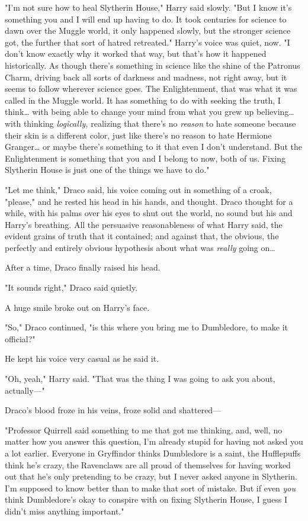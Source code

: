 "I'm not sure how to heal Slytherin House," Harry said slowly. "But I know it's 
something you and I will end up having to do. It took centuries for science to 
dawn over the Muggle world, it only happened slowly, but the stronger science 
got, the further that sort of hatred retreated." Harry's voice was quiet, now. 
"I don't know exactly why it worked that way, but that's how it happened 
historically. As though there's something in science like the shine of the 
Patronus Charm, driving back all sorts of darkness and madness, not right away, 
but it seems to follow wherever science goes. The Enlightenment, that was what 
it was called in the Muggle world. It has something to do with seeking the 
truth, I think{\ldots} with being able to change your mind from what you grew 
up believing{\ldots} with thinking \emph{logically,} realizing that there's no 
\emph{reason} to hate someone because their skin is a different color, just 
like there's no reason to hate Hermione Granger{\ldots} or maybe there's 
something to it that even I don't understand. But the Enlightenment is 
something that you and I belong to now, both of us. Fixing Slytherin House is 
just one of the things we have to do."

"Let me think," Draco said, his voice coming out in something of a croak, 
"please," and he rested his head in his hands, and thought.
\sbreak
Draco thought for a while, with his palms over his eyes to shut out the world, 
no sound but his and Harry's breathing. All the persuasive reasonableness of 
what Harry said, the evident grains of truth that it contained; and against 
that, the obvious, the perfectly and entirely obvious hypothesis about what was 
\emph{really} going on{\ldots}

After a time, Draco finally raised his head.

"It sounds right," Draco said quietly.

A huge smile broke out on Harry's face.

"So," Draco continued, "is this where you bring me to Dumbledore, to make it 
official?"

He kept his voice very casual as he said it.

"Oh, yeah," Harry said. "That was the thing I was going to ask you about, 
actually---"

Draco's blood froze in his veins, froze solid and shattered---

"Professor Quirrell said something to me that got me thinking, and, well, no 
matter how you answer this question, I'm already stupid for having not asked 
you a lot earlier. Everyone in Gryffindor thinks Dumbledore is a saint, the 
Hufflepuffs think he's crazy, the Ravenclaws are all proud of themselves for 
having worked out that he's only pretending to be crazy, but I never asked 
anyone in Slytherin. I'm supposed to know better than to make that sort of 
mistake. But if even \emph{you} think Dumbledore's okay to conspire with on 
fixing Slytherin House, I guess I didn't miss anything important."

